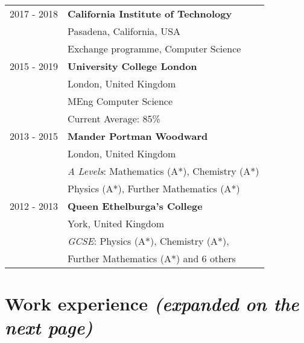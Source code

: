 \documentclass{article}
\begin{document}
\begin{multicols}{2}
\begin{tabular}{ r l }
 2017 - 2018 & \textbf{California Institute of Technology} \\ 
 & \color{gray} Pasadena, California, USA\\
 \vspace{2mm}
 & Exchange programme, Computer Science\\
 2015 - 2019 & \textbf{University College London} \\ 
 & \color{gray} London, United Kingdom\\
 & MEng Computer Science\\
 \vspace{2mm}
 & Current Average: 85\%\\
 2013 - 2015 & \textbf{Mander Portman Woodward} \\
 & \color{gray} London, United Kingdom\\
 & \textit{A Levels}: Mathematics (A*), Chemistry (A*)\\
 \vspace{2mm}
 & Physics (A*), Further Mathematics (A*)\\
 2012 - 2013 & \textbf{Queen Ethelburga's College} \\
 & \color{gray} York, United Kingdom\\
 & \textit{GCSE}: Physics (A*), Chemistry (A*),\\
 & Further Mathematics (A*) and 6 others\\
\end{tabular}

\section*{\normalfont Work experience \emph{\small\color{gray}(expanded on the next page)}}


\end{multicols}
\end{document}
